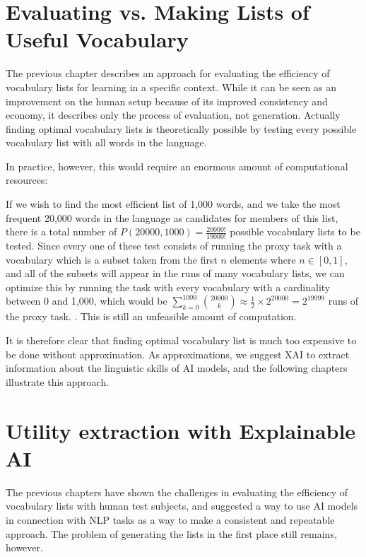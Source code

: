 \section{Evaluating vs. Making Lists of Useful Vocabulary} \label{sec:eval-vs-creation}
The previous chapter describes an approach for evaluating the efficiency of vocabulary lists for learning in a specific context.
While it can be seen as an improvement on the human setup because of its improved consistency and economy, it describes only the process of evaluation, not generation.
Actually finding optimal vocabulary lists is theoretically possible by testing every possible vocabulary list with all words in the language.

In practice, however, this would require an enormous amount of computational resources:

If we wish to find the most efficient list of 1,000 words, and we take the most frequent 20,000 words in the language as candidates for members of this list, there is a total number of $P(20000, 1000) = \frac{20000!}{19000!}$ possible vocabulary lists to be tested.
Since every one of these test consists of running the proxy task with a vocabulary which is a subset taken from the first $n$ elements where $n \in [0, 1]$, and all of the subsets will appear in the runs of many vocabulary lists, we can optimize this by running the task with every vocabulary with a cardinality between 0 and 1,000, which would be
$
\sum_{k=0}^{1000} \binom{20000}{k} \approx \frac{1}{2} \times 2^{20000} = 2^{19999}
$ runs of the proxy task.
.
This is still an unfeasible amount of computation. 

It is therefore clear that finding optimal vocabulary list is much too expensive to be done without approximation.
As approximations, we suggest XAI to extract information about the linguistic skills of AI models, and the following chapters illustrate this approach.

\section{Utility extraction with Explainable AI} \label{sec:utility-extraction-with-xai}

The previous chapters have shown the challenges in evaluating the efficiency of vocabulary lists with human test subjects, and suggested a way to use AI models in connection with NLP tasks as a way to make a consistent and repeatable approach.
The problem of generating the lists in the first place still remains, however.

